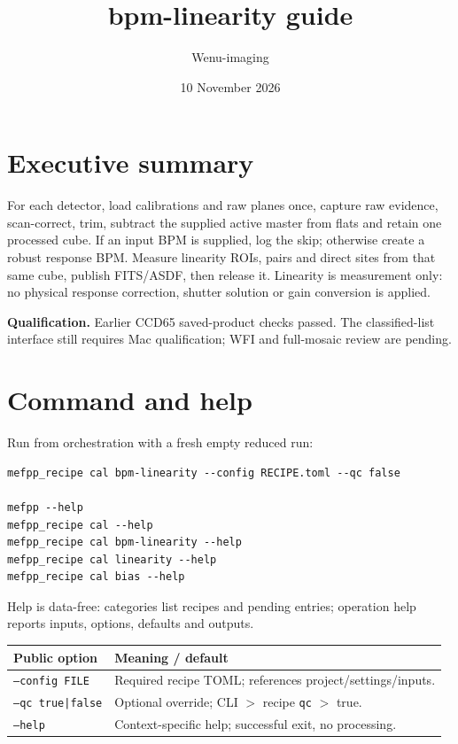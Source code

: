 \documentclass[10pt,a4paper]{article}
\title{bpm-linearity guide}
\author{Wenu-imaging}
\date{10 November 2026}
\begin{document}
\maketitle
\section*{Executive summary}
For each detector, load calibrations and raw planes once, capture raw evidence,
scan-correct, trim, subtract the supplied active master from flats and retain one
processed cube. If an input BPM is supplied, log the skip; otherwise create a
robust response BPM. Measure linearity ROIs, pairs and direct sites from that
same cube, publish FITS/ASDF, then release it. Linearity is measurement only:
no physical response correction, shutter solution or gain conversion is applied.

\textbf{Qualification.} Earlier CCD65 saved-product checks passed. The classified-list
interface still requires Mac qualification; WFI and full-mosaic review are pending.

\section*{Command and help}
Run from orchestration with a fresh empty reduced run:
\begin{verbatim}
mefpp_recipe cal bpm-linearity --config RECIPE.toml --qc false

mefpp --help
mefpp_recipe cal --help
mefpp_recipe cal bpm-linearity --help
mefpp_recipe cal linearity --help
mefpp_recipe cal bias --help
\end{verbatim}
Help is data-free: categories list recipes and pending entries; operation help
reports inputs, options, defaults and outputs.

\begin{tabular}{p{.26\linewidth}p{.67\linewidth}}
\textbf{Public option} & \textbf{Meaning / default}\\\hline
\texttt{--config FILE} & Required recipe TOML; references project/settings/inputs.\\
\texttt{--qc true|false} & Optional override; CLI $>$ recipe \texttt{qc} $>$ true.\\
\texttt{--help} & Context-specific help; successful exit, no processing.\\
\end{tabular}
\end{document}
